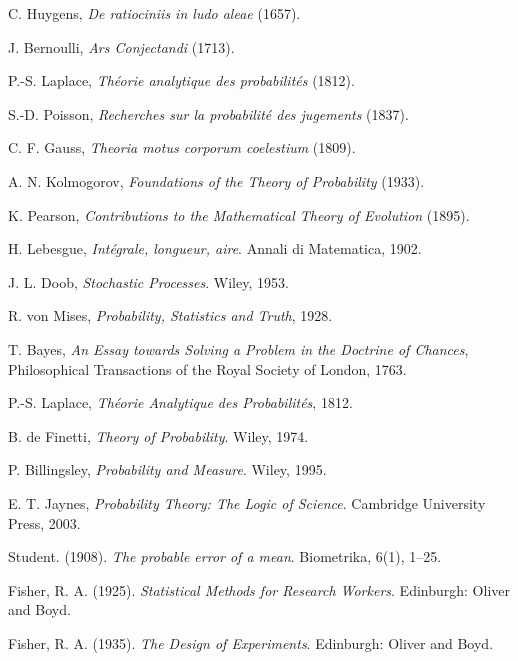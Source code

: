 \documentclass{book}
\begin{document}
\begin{thebibliography}{999}
C. Huygens,
\textit{De ratiociniis in ludo aleae} (1657).

J. Bernoulli,
\textit{Ars Conjectandi} (1713).

P.-S. Laplace, \textit{Théorie analytique des probabilités} (1812).

S.-D. Poisson, \textit{Recherches sur la probabilité des jugements} (1837).

C. F. Gauss, \textit{Theoria motus corporum coelestium} (1809).

A. N. Kolmogorov, \textit{Foundations of the Theory of Probability} (1933).

K. Pearson, \textit{Contributions to the Mathematical Theory of Evolution} (1895).

H. Lebesgue,
\textit{Intégrale, longueur, aire}.
Annali di Matematica, 1902.

J. L. Doob, 
\textit{Stochastic Processes}.
 Wiley, 1953.

R. von Mises, 
\textit{Probability, Statistics and Truth}, 1928.

T. Bayes, 
\textit{An Essay towards Solving a Problem in the Doctrine of Chances}, Philosophical Transactions of the Royal Society of London, 1763.

P.-S. Laplace, 
\textit{Théorie Analytique des Probabilités}, 1812.

B. de Finetti, 
\textit{Theory of Probability}.
Wiley, 1974.

P. Billingsley, 
\textit{Probability and Measure}.
Wiley, 1995.

E. T. Jaynes, \textit{Probability Theory: The Logic of Science}.
Cambridge University Press, 2003.



Student. (1908). \textit{The probable error of a mean}.
Biometrika, 6(1), 1–25.

Fisher, R. A. (1925). \textit{Statistical Methods for Research Workers}.
Edinburgh: Oliver and Boyd.

Fisher, R. A. (1935). \textit{The Design of Experiments}.
Edinburgh: Oliver and Boyd.


\end{thebibliography}
\end{document}

